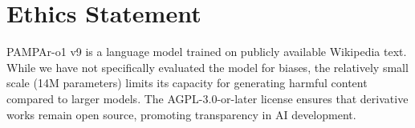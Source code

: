 \documentclass[11pt,a4paper]{article}
\begin{document}
\section*{Ethics Statement}

PAMPAr-o1 v9 is a language model trained on publicly available Wikipedia text. While we have not specifically evaluated the model for biases, the relatively small scale (14M parameters) limits its capacity for generating harmful content compared to larger models. The AGPL-3.0-or-later license ensures that derivative works remain open source, promoting transparency in AI development.


\end{document}
